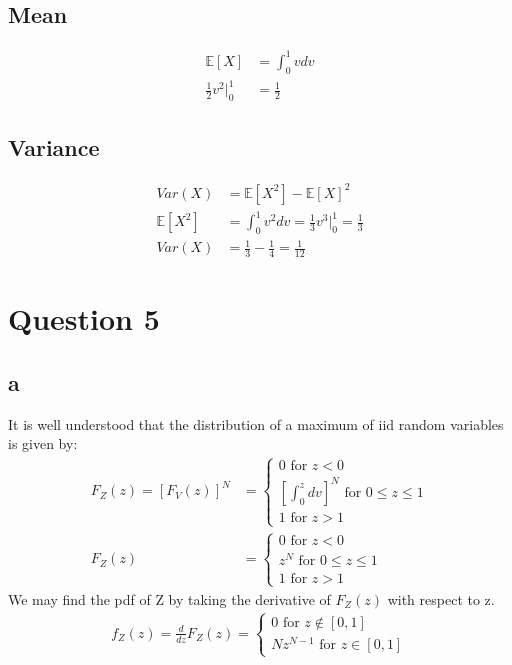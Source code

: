 \documentclass[10pt,letterpaper]{paper}
\begin{document}
\subsection*{Mean}

\begin{align*}
  \mathbb{E}[X] &= \int_0^1 vdv\\
  \frac{1}{2}v^2 \big |_0^1 &= \frac{1}{2}
\end{align*}

\subsection*{Variance}
\begin{align*}
  Var(X) &= \mathbb{E}[X^2] - {\mathbb{E}[X]}^2\\
  \mathbb{E}[X^2] &= \int_0^1 v^2 dv = \frac{1}{3}v^3 \big |_0^1 = \frac{1}{3}\\
  Var(X) &= \frac{1}{3} - \frac{1}{4} = \frac{1}{12}
\end{align*}

\section*{Question 5}

\subsection*{a}
It is well understood that the distribution of a maximum of iid random variables
is given by:
\begin{align*}
  F_Z(z) = [F_V(z)]^N &=
  \begin{cases}
    0 \text{ for } z < 0\\
    [\int_0^z dv]^N \text{ for } 0 \leq z \leq 1\\
    1 \text{ for } z > 1
  \end{cases}\\
  F_Z(z) &=
  \begin{cases}
    0 \text{ for } z < 0 \\
    z^N \text{ for } 0 \le z \leq 1\\
    1 \text{ for } z > 1
  \end{cases}
\end{align*}
We may find the pdf of Z by taking the derivative of $F_Z(z)$ with respect to z.
\begin{align*}
  f_Z(z) = \frac{d}{dz} F_Z(z) =
  \begin{cases}
    0 \text{ for } z  \notin [0,1]\\
    Nz^{N-1} \text{ for } z \in [0,1]
  \end{cases}
\end{align*}
\end{document}
